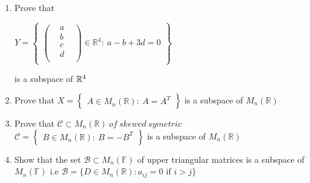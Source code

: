 \documentclass[45pt]{article}
\begin{document}
\begin{enumerate}
  \item Prove that 

  
  $ Y \pmb{=} \begin{Bmatrix}
    \begin{pmatrix} 
    & a  \\
    & b & \\
    & c & \\
    & d & \\
    \end{pmatrix} \in \mathbb{R}^4 : ~
    a-b+3d\pmb{=}0
    \end{Bmatrix}$
  
is a subspace of $\mathbb{R}^4\\\\$
  
  \item Prove that 
$X \pmb{=} \begin{Bmatrix}
    A \in M_n(\mathbb{R}): ~ A=A^T
    \end{Bmatrix}$ is a subspace of $ M_n(\mathbb{R})$
\item Prove that
$ \mathcal{C} \subset M_n(\mathbb{R}) ~ of ~ skewed~ symetric$ \\
$\mathcal{C} \pmb{=} \begin{Bmatrix}
    B \in M_n(\mathbb{R}): ~ B=-B^T
	\end{Bmatrix}$
is a subspace of $ M_n(\mathbb{R})$
 \item Show that the set  $\mathcal{B}\subset M_n(\mathbb{F})$ of upper triangular matrices is a subspace of $M_n(\mathbb{F})$ i.e $\mathcal{B}=\{ D \in M_n(\mathbb{R}): a_{ij}=0$ if $ i>j \}$

\end{enumerate}
$ $\\
\end{document}

